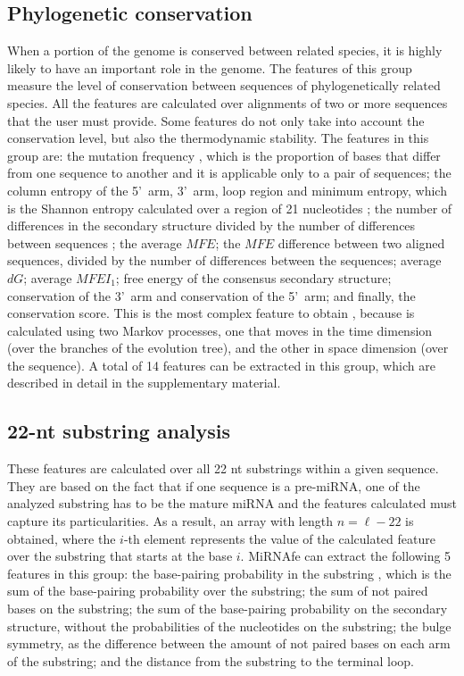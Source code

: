 \documentclass{article}
\begin{document}
\subsection{Phylogenetic conservation}
When a portion of the genome is conserved between related species, it is highly likely to have an important role in the genome. The features of this group 
measure the level of conservation between sequences of phylogenetically related species. All the features are calculated over alignments of two or more 
sequences that the user must provide. Some features do not only take into account the conservation level, but also the thermodynamic stability. The features in 
this group are: the mutation frequency \citep{Huang07}, which is the proportion of bases that differ from one sequence to another and it is applicable only to 
a pair of sequences; the column entropy of the 5\textquoteright~arm, 3\textquoteright~arm, loop region and minimum entropy, which is the Shannon entropy 
calculated over a region of 21 nucleotides \citep{Hertel06}; the number of differences in the secondary structure divided by the number of differences between 
sequences \citep{Huang07}; the average $MFE$; the $MFE$ difference between two aligned sequences, divided by the number of differences between the 
sequences\citep{Huang07}; average $dG$; average $MFEI_{1}$; free energy of the consensus secondary structure; conservation of the 3\textquoteright~arm and 
conservation of the 5\textquoteright~arm; and finally, the conservation score. This is the most complex feature to obtain \citep{Goro07}, because is calculated 
using two Markov processes, one that moves in the time dimension (over the branches of the evolution tree), and the other in space dimension (over the 
sequence). A total of 14 features can be extracted in this group, which are described in detail in the supplementary material.

\subsection{22-nt substring analysis}
These features are calculated over all 22 nt substrings within a given sequence. They are based on the fact that if one sequence is a pre-miRNA, one of the 
analyzed substring has to be the mature miRNA and the features calculated must capture its particularities. As a result, an array with length $n = \ell - 22$  
is obtained, where the $i$-th element represents the value of the calculated feature over the substring that starts at the base $i$. MiRNAfe can extract the 
following 5 features in this group: the base-pairing probability in the substring \citep{Lim03}, which is the sum of the base-pairing probability over the 
substring; the sum of not paired bases on the substring; the sum of the base-pairing probability on the secondary structure, without the probabilities of the 
nucleotides on the substring; the bulge symmetry, as the difference between the amount of not paired bases on each arm of the substring; and the distance from 
the substring to the terminal loop.
\end{document}
